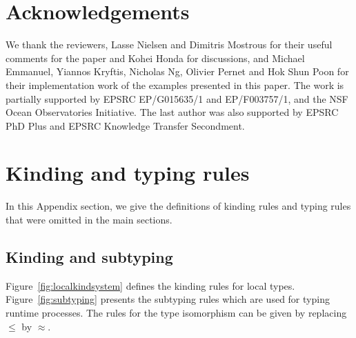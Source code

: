 \documentclass{LMCS}
\newcommand{\subT}{\ensuremath{\leq}}
\newcommand{\WB}{\approx}
\begin{document}
\section*{Acknowledgements}

We thank the reviewers,
Lasse Nielsen and Dimitris Mostrous for their useful comments for the
paper and  Kohei Honda for discussions, and
Michael Emmanuel, Yiannos Kryftis, Nicholas Ng, Olivier Pernet and Hok Shun Poon
for their implementation work of the examples presented
in this paper.
The work is partially supported by EPSRC EP/G015635/1 and EP/F003757/1, and the NSF Ocean Observatories Initiative. The last author was also supported by EPSRC PhD Plus and EPSRC Knowledge Transfer Secondment.







\appendix


\section{Kinding and typing rules}
In this Appendix section, we give the definitions of kinding rules and
typing rules 
that were omitted in the main sections.













\subsection{Kinding and subtyping}
\label{app:kind}
Figure~\ref{fig:localkindsystem} defines the kinding rules for local types.  
Figure~\ref{fig:subtyping}
presents the subtyping rules which are used for typing runtime processes. 
The rules for the type isomorphism can be given 
by replacing $\subT$ by $\WB$. 
\end{document}
